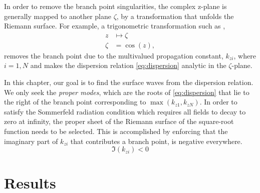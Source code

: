 \documentclass[12pt]{article}
\begin{document}
In order to remove the branch point singularities, the complex z-plane is generally mapped to another plane $\zeta$, by a transformation that unfolds the Riemann surface. For example, a trigonometric transformation such as \cite{Michalski2006,Polimeridis_2007},
%
\begin{equation}
  \begin{split}
    z &\mapsto \zeta \\
    \zeta &= \cos (z),
  \end{split}
  \label{eq:mapping}%
\end{equation}
%
removes the branch point due to the multivalued propagation constant, $k_{zi}$, where $i = 1,N$ and makes the dispersion relation \eqref{eq:dispersion} analytic in the $\zeta$-plane.
%
%

In this chapter, our goal is to find the surface waves from the dispersion relation. We only seek the \emph{proper modes}, which are the roots of \eqref{eq:dispersion} that lie to the right of the branch point corresponding to $\max(k_{z1},k_{zN})$. In order to satisfy the Sommerfeld radiation condition which requires all fields to decay to zero at infinity, the proper sheet of the Riemann surface of the square-root function needs to be selected. This is accomplished by enforcing that the imaginary part of $k_{zi}$ that contributes a branch point, is negative everywhere.
%
\begin{equation}
  \Im (k_{zi}) < 0
  \label{eq:proper}
\end{equation}
%
\section{Results}
%
\end{document}
